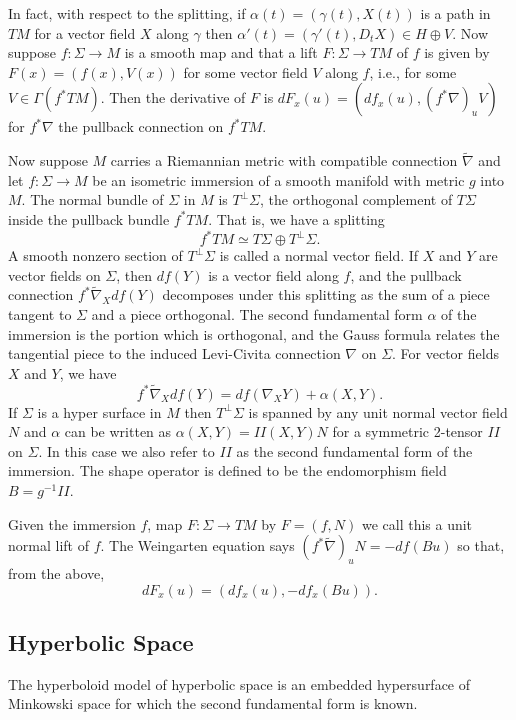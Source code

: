 \documentclass{amsart}
\newcommand{\two}{I\!\!I}
\begin{document}
In fact, with respect to the splitting, if $\alpha(t) = (\gamma(t),X(t))$ is a path in $TM$ for a vector field $X$ along $\gamma$ then $\alpha'(t) = (\gamma'(t),D_tX) \in H \oplus V$.
Now suppose $f:\Sigma \to M$ is a smooth map and that a lift $F: \Sigma \to TM$ of $f$ is given by $F(x) = (f(x),V(x))$ for some vector field $V$ along $f$, i.e., for some $V \in \Gamma(f^*TM)$.
Then the derivative of $F$ is $dF_x(u) = (df_x(u), (f^*\nabla)_u V)$ for $f^*\nabla$ the pullback connection on $f^*TM$.


Now suppose $M$ carries a Riemannian metric with compatible connection $\tilde{\nabla}$ and let $f: \Sigma \to M$ be an isometric immersion of a smooth manifold with metric $g$ into $M$.
The normal bundle of $\Sigma$ in $M$ is $T^\perp\Sigma$, the orthogonal complement of $T\Sigma$ inside the pullback bundle $f^*TM$.
That is, we have a splitting
\[
f^*TM \simeq T\Sigma \oplus T^\perp\Sigma.
\]
A smooth nonzero section of $T^\perp\Sigma$ is called a normal vector field.
If $X$ and $Y$ are vector fields on $\Sigma$, then $df(Y)$ is a vector field along $f$, and the pullback connection $f^*\tilde{\nabla}_Xdf(Y)$ decomposes under this splitting as the sum of a piece tangent to $\Sigma$ and a piece orthogonal. 
The second fundamental form $\alpha$ of the immersion is the portion which is orthogonal, and the Gauss formula relates the tangential piece to the induced Levi-Civita connection $\nabla$ on $\Sigma$.
For vector fields $X$ and $Y$, we have
\[
f^*\tilde{\nabla}_Xdf(Y) = df(\nabla_XY) + \alpha(X,Y).
\]
If $\Sigma$ is a hyper surface in $M$ then $T^\perp\Sigma$ is spanned by any unit normal vector field $N$ and $\alpha$ can be written as $\alpha(X,Y) = \two(X,Y)N$ for a symmetric 2-tensor $\two$ on $\Sigma$.
In this case we also refer to $\two$ as the second fundamental form of the immersion. 
The shape operator is defined to be the endomorphism field $B = g^{-1}\two$.

Given the immersion $f$, map $F: \Sigma \to TM$ by $F = (f,N)$ we call this a unit normal lift of $f$.
The Weingarten equation says $(f^*\tilde{\nabla})_uN = -df(Bu)$ so that, from the above, 
\[
dF_x(u) = (df_x(u),-df_x(Bu)).
\]

\subsection{Hyperbolic Space}

The hyperboloid model of hyperbolic space is an embedded hypersurface of Minkowski space for which the second fundamental form is known. 
\end{document}
